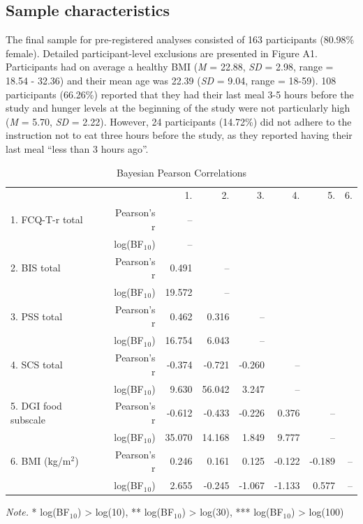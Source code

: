 \documentclass[man,floatsintext]{apa6}
\begin{document}
\subsection{Sample characteristics}\label{sample-characteristics}

The final sample for pre-registered analyses consisted of 163
participants (80.98\% female). Detailed participant-level exclusions are
presented in Figure A1. Participants had on average a healthy BMI
(\emph{M} = 22.88, \emph{SD} = 2.98, range = 18.54 - 32.36) and their
mean age was 22.39 (\emph{SD} = 9.04, range = 18-59). 108 participants
(66.26\%) reported that they had their last meal 3-5 hours before the
study and hunger levels at the beginning of the study were not
particularly high (\emph{M} = 5.70, \emph{SD} = 2.22). However, 24
participants (14.72\%) did not adhere to the instruction not to eat
three hours before the study, as they reported having their last meal
\enquote{less than 3 hours ago}.

\begin{table}[h]
    \centering
    \caption{Bayesian Pearson Correlations}
    \label{tab:bayesianPearsonCorrelations}
    {
        \begin{tabular}{lrrrrrrr}
            \toprule
             &  & 1. & 2. & 3. & 4. & 5. & 6.  \\
            \cmidrule[0.4pt]{1-8}
            1$.$ FCQ-T-r total & Pearson's r & -- &   &   &   &   &    \\
             & log(BF$_{1}$$_{0}$) & -- &  &  &  &  &   \\
            2$.$ BIS total & Pearson's r & 0.491 & -- &   &   &   &    \\
             & log(BF$_{1}$$_{0}$) & 19.572 & -- &  &  &  &   \\
            3$.$ PSS total & Pearson's r & 0.462 & 0.316 & -- &   &   &    \\
             & log(BF$_{1}$$_{0}$) & 16.754 & 6.043 & -- &  &  &   \\
            4$.$ SCS total & Pearson's r & -0.374 & -0.721 & -0.260 & -- &   &    \\
             & log(BF$_{1}$$_{0}$) & 9.630 & 56.042 & 3.247 & -- &  &   \\
            5$.$ DGI food subscale & Pearson's r & -0.612 & -0.433 & -0.226 & 0.376 & -- &    \\
             & log(BF$_{1}$$_{0}$) & 35.070 & 14.168 & 1.849 & 9.777 & -- &   \\
            6$.$ BMI (kg/m$^{2}$) & Pearson's r & 0.246 & 0.161 & 0.125 & -0.122 & -0.189 & --  \\
             & log(BF$_{1}$$_{0}$) & 2.655 & -0.245 & -1.067 & -1.133 & 0.577 & --  \\
            \bottomrule
        \end{tabular}
    }
    \begin{tablenotes}[para]
\footnotesize{\textit{Note.} * log(BF$_{1}$$_{0}$)  > log(10), **  log(BF$_{1}$$_{0}$)  > log(30), ***  log(BF$_{1}$$_{0}$)  > log(100)}
\end{tablenotes}
\end{table}
\end{document}
